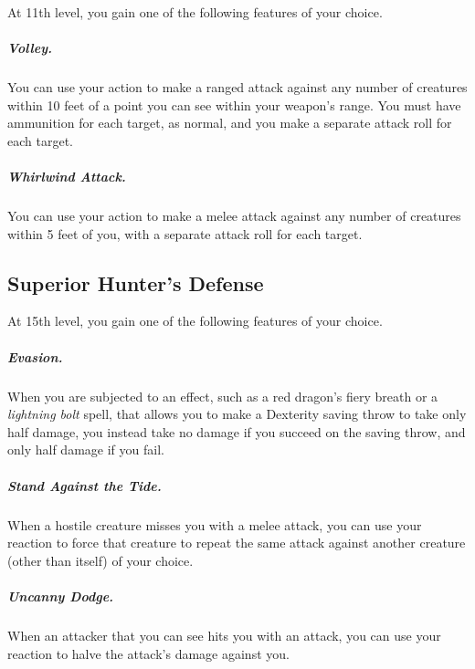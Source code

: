 At 11th level, you gain one of the following features of your choice.

\subparagraph*{Volley.} You can use your action to make a ranged attack against any number of creatures within 10 feet of a point you can see within your weapon's range. You must have ammunition for each target, as normal, and you make a separate attack roll for each target.

\subparagraph*{Whirlwind Attack.} You can use your action to make a melee attack against any number of creatures within 5 feet of you, with a separate attack roll for each target.

\subsection{Superior Hunter's Defense}

At 15th level, you gain one of the following features of your choice.

\subparagraph*{Evasion.} When you are subjected to an effect, such as a red dragon's fiery breath or a \textit{lightning bolt} spell, that allows you to make a Dexterity saving throw to take only half damage, you instead take no damage if you succeed on the saving throw, and only half damage if you fail.

\subparagraph*{Stand Against the Tide.} When a hostile creature misses you with a melee attack, you can use your reaction to force that creature to repeat the same attack against another creature (other than itself) of your choice.

\subparagraph*{Uncanny Dodge.} When an attacker that you can see hits you with an attack, you can use your reaction to halve the attack's damage against you.